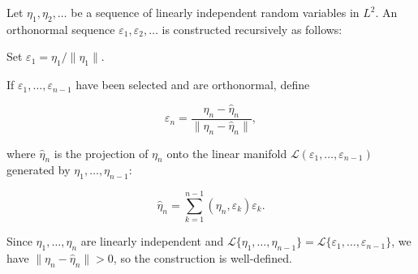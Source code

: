 Let $\eta_1, \eta_2, \ldots$ be a sequence of linearly independent random variables in $L^2$. An orthonormal sequence $\varepsilon_1, \varepsilon_2, \ldots$ is constructed recursively as follows:

Set $\varepsilon_1 = \eta_1 / \|\eta_1\|$.

If $\varepsilon_1, \ldots, \varepsilon_{n-1}$ have been selected and are orthonormal, define

$$\varepsilon_n = \frac{\eta_n - \hat{\eta}_n}{\|\eta_n - \hat{\eta}_n\|},$$

where $\hat{\eta}_n$ is the projection of $\eta_n$ onto the linear manifold $\mathcal{L}(\varepsilon_1, \ldots, \varepsilon_{n-1})$ generated by $\eta_1, \ldots, \eta_{n-1}$:

$$\hat{\eta}_n = \sum_{k=1}^{n-1} (\eta_n, \varepsilon_k) \varepsilon_k.$$

Since $\eta_1, \ldots, \eta_n$ are linearly independent and $\mathcal{L}\{\eta_1, \ldots, \eta_{n-1}\} = \mathcal{L}\{\varepsilon_1, \ldots, \varepsilon_{n-1}\}$, we have $\|\eta_n - \hat{\eta}_n\| > 0$, so the construction is well-defined.
